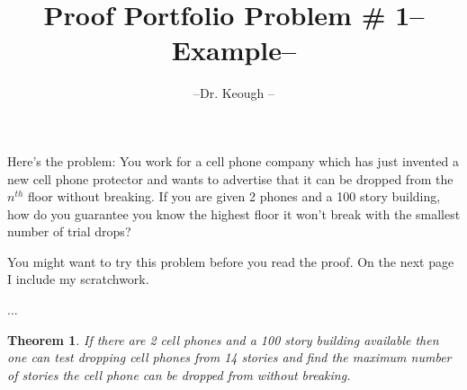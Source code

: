 \documentclass{article}  %
\title{Proof Portfolio Problem \#  1--  Example--}
\author{--Dr. Keough --}
\date{}
\newtheorem*{thm}{Theorem}
\begin{document}
\maketitle  %


Here's the problem: You work for a cell phone company which has just invented a new cell phone protector and wants to advertise that it can be dropped from the $n^{th}$ floor without breaking. 
If you are given 2 phones and a 100 story building, how do you guarantee you know the highest floor it won't break with the smallest number of trial drops?


You might want to try this problem before you read the proof. On the next page I include my scratchwork.

\newpage
...

\newpage



\begin{thm}
If there are 2 cell phones and a 100 story building available then one can test dropping cell phones from 14 stories and find the maximum number of stories the cell phone can be dropped from without breaking.
\end{thm}
\end{document}
